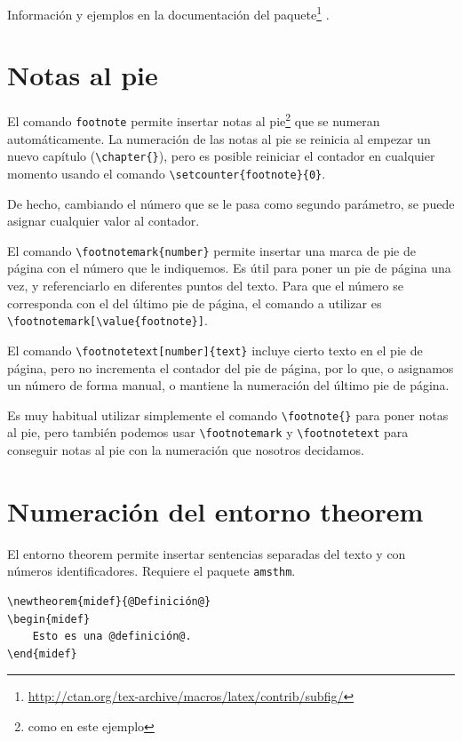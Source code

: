 \documentclass[12pt,a4paper, oneside]{report}
\begin{document}
Información y ejemplos en la documentación del
paquete\footnote{\url{http://ctan.org/tex-archive/macros/latex/contrib/subfig/}}
.

\clearpage
\section{Notas al pie}

El comando \texttt{footnote} permite insertar notas al pie\footnote{como en este ejemplo} que se numeran automáticamente. La numeración de las notas al pie se reinicia al empezar un nuevo capítulo (\verb+\chapter{}+), pero es posible reiniciar el contador en cualquier momento usando el comando \verb+\setcounter{footnote}{0}+.

De hecho, cambiando el número que se le pasa como segundo parámetro, se puede asignar cualquier valor al contador.

El comando \verb+\footnotemark{number}+ permite insertar una marca de pie de página con el número que le indiquemos. Es útil para poner un pie de página una vez, y referenciarlo en diferentes puntos del texto\footnotemark[\value{footnote}]. Para que el número se corresponda con el del último pie de página, el comando a utilizar es \verb+\footnotemark[\value{footnote}]+.

El comando \verb+\footnotetext[number]{text}+ incluye cierto texto en el pie de página, pero no incrementa el contador del pie de página, por lo que, o asignamos un número de forma manual, o mantiene la numeración del último pie de página.

Es muy habitual utilizar simplemente el comando \verb+\footnote{}+ para poner notas al pie, pero también podemos usar \verb+\footnotemark+ y \verb+\footnotetext+ para conseguir notas al pie con la numeración que nosotros decidamos.

\section{Numeración del entorno theorem}

El entorno theorem permite insertar sentencias separadas del texto y con números identificadores. Requiere el paquete \texttt{amsthm}.
\begin{lstlisting}
\newtheorem{midef}{@Definición@}
\begin{midef}
	Esto es una @definición@.
\end{midef}
\end{lstlisting}
\end{document}
